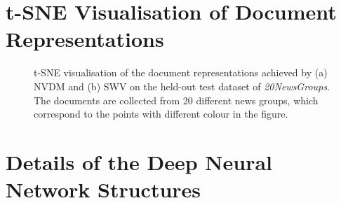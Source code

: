 \documentclass{article}
\begin{document}
\newpage
\begin{appendices}

\section{t-SNE Visualisation of Document Representations }
\label{app:a}
\begin{figure}[!h]
\centering
{}
\hfill
{}
\caption{t-SNE visualisation of the document representations achieved by (a) NVDM and (b) SWV \citep{maas2011learning} on the held-out test dataset of \textit{20NewsGroups}. The documents are collected from 20 different news groups, which correspond to the points with different colour in the figure. }
\end{figure}

\section{Details of the Deep Neural Network Structures }


\end{appendices}
\end{document}
